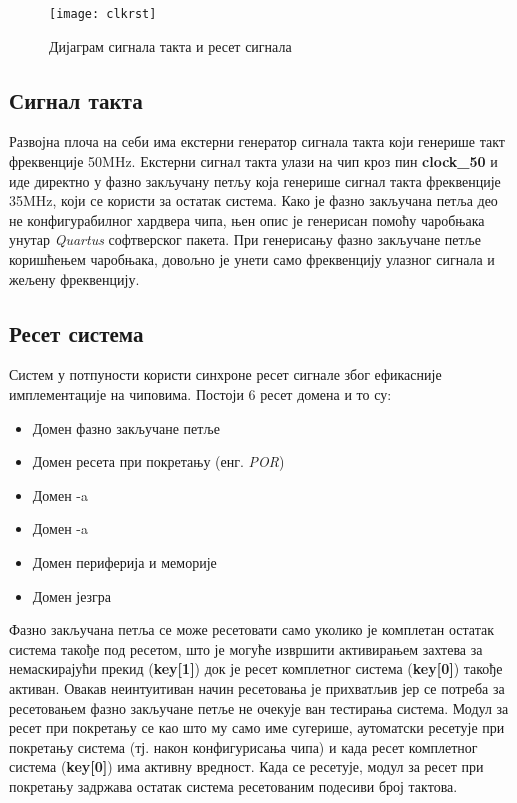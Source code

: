 \begin{figure}[h!]
	\centering
	\texttt{[image: clkrst]}
	\caption{Дијаграм сигнала такта и ресет сигнала}
	\label{fig:clkrst}
\end{figure}

\subsection{Сигнал такта}

Развојна плоча на себи има екстерни генератор сигнала такта који генерише такт фреквенције 50MHz. Екстерни сигнал такта улази на чип кроз пин \textbf{clock\_50} и иде директно у фазно закључану петљу која генерише сигнал такта фреквенције 35MHz, који се користи за остатак система. Како је фазно закључана петља део не конфигурабилног хардвера  чипа, њен опис је генерисан помоћу чаробњака унутар \textit{Quartus} софтверског пакета. При генерисању фазно закључане петље коришћењем чаробњака, довољно је унети само фреквенцију улазног сигнала и жељену фреквенцију.  

\subsection{Ресет система}

Систем у потпуности користи синхроне ресет сигнале због ефикасније имплементације на  чиповима. Постоји 6 ресет домена и то су:
\begin{itemize}
	\item Домен фазно закључане петље
	\item Домен ресета при покретању (енг. \textit{\acrfull{POR}})
	\item Домен -a
	\item Домен -a
	\item Домен периферија и меморије
	\item Домен језгра
\end{itemize}

Фазно закључана петља се може ресетовати само уколико је комплетан остатак система такође под ресетом, што је могуће извршити активирањем захтева за немаскирајући прекид (\textbf{key[1]}) док је ресет комплетног система (\textbf{key[0]}) такође активан. Овакав неинтуитиван начин ресетовања је прихватљив јер се потреба за ресетовањем фазно закључане петље не очекује ван тестирања система.
Модул за ресет при покретању се као што му само име сугерише, аутоматски ресетује при покретању система (тј. након конфигурисања  чипа) и када ресет комплетног система (\textbf{key[0]}) има активну вредност. Када се ресетује, модул за ресет при покретању задржава остатак система ресетованим подесиви број тактова.

